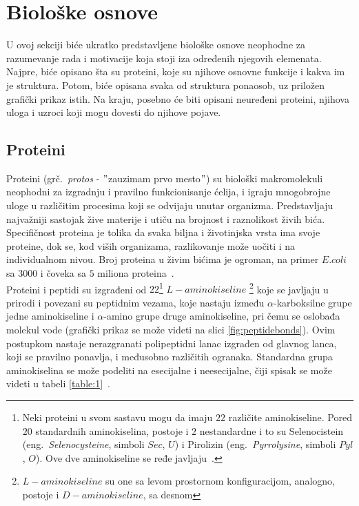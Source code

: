 \chapter{Biološke osnove} %
\label{bioloskeosnove} %

U ovoj sekciji biće ukratko predstavljene biološke osnove neophodne za razumevanje rada i motivacije koja stoji iza određenih njegovih elemenata.
Najpre, biće opisano šta su proteini, koje su njihove osnovne funkcije i kakva im je struktura. Potom, biće opisana svaka od struktura ponaosob, uz priložen grafički prikaz istih. Na kraju, posebno će biti opisani neuređeni proteini, njihova uloga i uzroci koji mogu dovesti do njihove pojave. 

\section{Proteini}
\label{sec:proteini}

Proteini (grč.~{\em protos} - $"$zauzimam prvo mesto$"$) su biološki makromolekuli neophodni za izgradnju i pravilno funkcionisanje ćelija, i igraju mnogobrojne uloge u različitim procesima koji se odvijaju unutar organizma. Predstavljaju najvažniji sastojak žive materije i utiču na brojnost i raznolikost živih bića. Specifičnost proteina je tolika da svaka biljna i životinjska vrsta ima svoje proteine, dok se, kod viših organizama, razlikovanje može uočiti i na individualnom nivou. Broj proteina u živim bićima je ogroman, na primer $E. coli$ sa $3000$ i čoveka sa $5$ miliona proteina~\cite{spasic}.\\

Proteini i peptidi su izgrađeni od $22$\footnote{Neki proteini u svom sastavu mogu da imaju $22$ različite aminokiseline. Pored $20$ standardnih aminokiselina, postoje i $2$ nestandardne i to su Selenocistein (eng.~{\em Selenocysteine}, simboli $Sec$, $U$) i Pirolizin (eng.~{\em Pyrrolysine},
simboli $Pyl$, $O$). Ove dve aminokiseline se ređe javljaju~\cite{MarijaJ}.} $L-aminokiseline$ \footnote{$L-aminokiseline$ su one sa levom prostornom konfiguracijom, analogno, postoje i $D-aminokiseline$, sa desnom} koje se javljaju u prirodi i povezani su peptidnim vezama, koje nastaju između $\alpha$-karboksilne grupe jedne aminokiseline i $\alpha$-amino grupe druge aminokiseline, pri čemu se oslobađa molekul vode (grafički prikaz se može videti na slici \ref{fig:peptidebonds}). Ovim postupkom nastaje nerazgranati polipeptidni lanac izgrađen od glavnog lanca, koji se pravilno ponavlja, i međusobno različitih ogranaka. Standardna grupa aminokiselina se može podeliti na esecijalne i
neesecijalne, čiji spisak se može videti u tabeli \ref{table:1}~\cite{MarijaJ,biopathways}.\\ 

